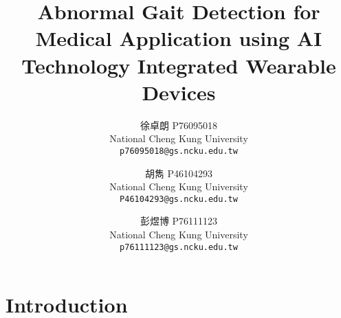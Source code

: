\documentclass[10pt,twocolumn,letterpaper]{article}
\begin{document}
\title{Abnormal Gait Detection for Medical Application using AI Technology Integrated Wearable Devices}

\author{徐卓朗 P76095018\\
National Cheng Kung University\\
{\tt\small p76095018@gs.ncku.edu.tw}
\and
胡雋 P46104293\\
National Cheng Kung University\\
{\tt\small P46104293@gs.ncku.edu.tw}
\and
彭煜博 P76111123\\
National Cheng Kung University\\
{\tt\small p76111123@gs.ncku.edu.tw}
}
\maketitle


  

\section{Introduction}
\label{sec:intro}
\end{document}
